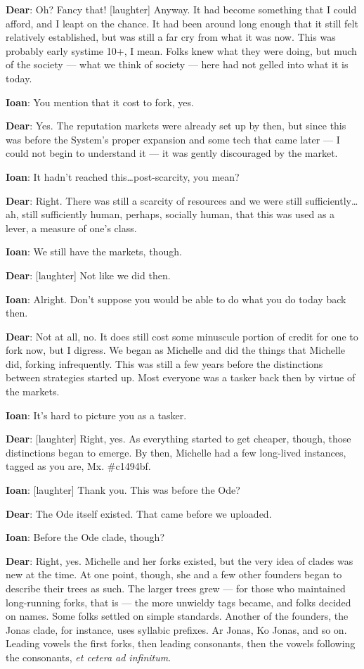 \textbf{Dear}: Oh? Fancy that! {[}laughter{]} Anyway. It had become something that I could afford, and I leapt on the chance. It had been around long enough that it still felt relatively established, but was still a far cry from what it was now. This was probably early systime 10+, I mean. Folks knew what they were doing, but much of the society — what we think of society — here had not gelled into what it is today.

\textbf{Ioan}: You mention that it cost to fork, yes.

\textbf{Dear}: Yes. The reputation markets were already set up by then, but since this was before the System's proper expansion and some tech that came later — I could not begin to understand it — it was gently discouraged by the market.

\textbf{Ioan}: It hadn't reached this\ldots{}post-scarcity, you mean?

\textbf{Dear}: Right. There was still a scarcity of resources and we were still sufficiently\ldots{}ah, still sufficiently human, perhaps, socially human, that this was used as a lever, a measure of one's class.

\textbf{Ioan}: We still have the markets, though.

\textbf{Dear}: {[}laughter{]} Not like we did then.

\textbf{Ioan}: Alright. Don't suppose you would be able to do what you do today back then.

\textbf{Dear}: Not at all, no. It does still cost some minuscule portion of credit for one to fork now, but I digress. We began as Michelle and did the things that Michelle did, forking infrequently. This was still a few years before the distinctions between strategies started up. Most everyone was a tasker back then by virtue of the markets.

\textbf{Ioan}: It's hard to picture you as a tasker.

\textbf{Dear}: {[}laughter{]} Right, yes. As everything started to get cheaper, though, those distinctions began to emerge. By then, Michelle had a few long-lived instances, tagged as you are, Mx. \#c1494bf.

\textbf{Ioan}: {[}laughter{]} Thank you. This was before the Ode?

\textbf{Dear}: The Ode itself existed. That came before we uploaded.

\textbf{Ioan}: Before the Ode clade, though?

\textbf{Dear}: Right, yes. Michelle and her forks existed, but the very idea of clades was new at the time. At one point, though, she and a few other founders began to describe their trees as such. The larger trees grew — for those who maintained long-running forks, that is — the more unwieldy tags became, and folks decided on names. Some folks settled on simple standards. Another of the founders, the Jonas clade, for instance, uses syllabic prefixes. Ar Jonas, Ko Jonas, and so on. Leading vowels the first forks, then leading consonants, then the vowels following the consonants, \emph{et cetera ad infinitum}.

